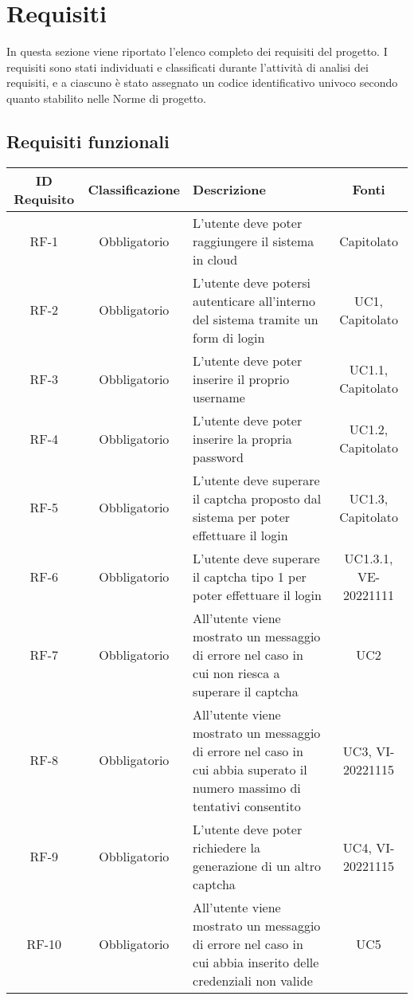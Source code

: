 \section{Requisiti}
In questa sezione viene riportato l'elenco completo dei requisiti del progetto.
I requisiti sono stati individuati e classificati durante l'attività di analisi dei requisiti, e a ciascuno è stato assegnato un codice identificativo univoco secondo quanto stabilito nelle Norme di progetto.

\subsection{Requisiti funzionali}

\renewcommand\tabularxcolumn[1]{>{\Centering}m{#1}}
\begin{tabularx}{\textwidth}{| c | c | X | c |} 
 \hline
 \textbf{ID Requisito} & \textbf{Classificazione} & \textbf{Descrizione} & \textbf{Fonti} \\
 \hline
 RF-1 & Obbligatorio &  L'utente deve poter raggiungere il sistema in cloud & Capitolato\\
 \hline
  RF-2 & Obbligatorio &  L'utente deve potersi autenticare all'interno del sistema tramite un form di login &  UC1, Capitolato\\
 \hline
 RF-3 & Obbligatorio &  L'utente deve poter inserire il proprio username &  UC1.1, Capitolato\\
 \hline
 RF-4 & Obbligatorio &  L'utente deve poter inserire la propria password &  UC1.2, Capitolato\\
 \hline
 RF-5 & Obbligatorio &  L'utente deve superare il captcha proposto dal sistema per poter effettuare il login &  UC1.3, Capitolato\\
 \hline
 RF-6 & Obbligatorio &  L'utente deve superare il captcha tipo 1 per poter effettuare il login &  UC1.3.1, VE-20221111\\
 \hline
 RF-7 & Obbligatorio & All'utente viene mostrato un messaggio di errore nel caso in cui non riesca a superare il captcha &  UC2\\
 \hline
 RF-8 & Obbligatorio &  All'utente viene mostrato un messaggio di errore nel caso in cui abbia superato il numero massimo di tentativi consentito &  UC3, VI-20221115\\
 \hline
 RF-9 & Obbligatorio &  L'utente deve poter richiedere la generazione di un altro captcha &  UC4, VI-20221115\\
 \hline
 RF-10 & Obbligatorio & All'utente viene mostrato un messaggio di errore nel caso in cui abbia inserito delle credenziali non valide &  UC5\\
 \hline
\end{tabularx}

